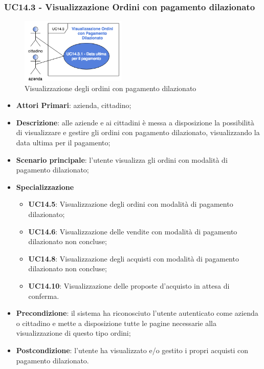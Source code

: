 \subsubsection{UC14.3 - Visualizzazione Ordini con pagamento dilazionato}
\begin{figure}[H]
	\includegraphics[width=5cm]{res/images/UC14-3.png}
	\centering
	\caption{Visualizzazione degli ordini con pagamento dilazionato}
\end{figure}
\begin{itemize}
	\item \textbf{Attori Primari}: azienda, cittadino;
	\item \textbf{Descrizione}: alle aziende e ai cittadini è messa a disposizione la possibilità di visualizzare e gestire gli ordini con pagamento dilazionato, visualizzando la data ultima per il pagamento;
	\item \textbf{Scenario principale}: l'utente visualizza gli ordini con modalità di pagamento dilazionato;
			\item \textbf{Specializzazione}
	\begin{itemize}
		\item \textbf{UC14.5}: Visualizzazione degli ordini con modalità di pagamento dilazionato;
		\item \textbf{UC14.6}: Visualizzazione delle vendite con modalità di pagamento dilazionato non concluse;
		\item \textbf{UC14.8}: Visualizzazione degli acquisti con modalità di pagamento dilazionato non concluse;
		\item \textbf{UC14.10}: Visualizzazione delle proposte d'acquisto in attesa di conferma.
	\end{itemize}
	\item \textbf{Precondizione}: il sistema ha riconosciuto l'utente autenticato come azienda o cittadino e mette a disposizione tutte le pagine necessarie alla visualizzazione di questo tipo ordini;
	\item \textbf{Postcondizione}: l'utente ha visualizzato e/o gestito i propri acquisti con pagamento dilazionato.
\end{itemize} 


